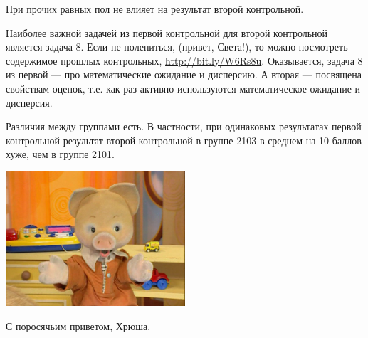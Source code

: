 \documentclass[pdftex,12pt,a4paper]{article}\usepackage{graphicx, color}
\begin{document}
При прочих равных пол не влияет на результат второй контрольной. 

Наиболее важной задачей из первой контрольной для второй контрольной является задача 8. Если не полениться, (привет, Света!), то можно посмотреть содержимое прошлых контрольных, \url{http://bit.ly/W6Rs8u}. Оказывается, задача 8 из первой --- про математические ожидание и дисперсию. А вторая --- посвящена свойствам оценок, т.е. как раз активно используются математическое ожидание и дисперсия.

Различия между группами есть. В частности, при одинаковых результатах первой контрольной результат второй контрольной в группе 2103 в среднем на 10 баллов хуже, чем в группе 2101. 


\includegraphics[height=5cm]{khrusha.jpg}

С поросячьим приветом, Хрюша.
\end{document}
